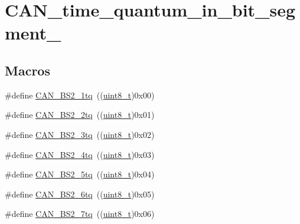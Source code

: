 \hypertarget{group___c_a_n__time__quantum__in__bit__segment__2}{}\section{C\+A\+N\+\_\+time\+\_\+quantum\+\_\+in\+\_\+bit\+\_\+segment\+\_}
\label{group___c_a_n__time__quantum__in__bit__segment__2}
\subsection*{Macros}
\begin{DoxyCompactItemize}
\item 
\#define \hyperlink{group___c_a_n__time__quantum__in__bit__segment__2_gad9af25a3f61df7b09b8d6a5e81d8027e}{C\+A\+N\+\_\+\+B\+S2\+\_\+1tq}~((\hyperlink{_p_e___types_8h_aba7bc1797add20fe3efdf37ced1182c5}{uint8\+\_\+t})0x00)
\item 
\#define \hyperlink{group___c_a_n__time__quantum__in__bit__segment__2_gac43d82f74990620499f1998187ff3602}{C\+A\+N\+\_\+\+B\+S2\+\_\+2tq}~((\hyperlink{_p_e___types_8h_aba7bc1797add20fe3efdf37ced1182c5}{uint8\+\_\+t})0x01)
\item 
\#define \hyperlink{group___c_a_n__time__quantum__in__bit__segment__2_gab3d325ce4a5d0eb1ee8ee50ad4ec7e49}{C\+A\+N\+\_\+\+B\+S2\+\_\+3tq}~((\hyperlink{_p_e___types_8h_aba7bc1797add20fe3efdf37ced1182c5}{uint8\+\_\+t})0x02)
\item 
\#define \hyperlink{group___c_a_n__time__quantum__in__bit__segment__2_gaaff1c1cdd809f185299971c6437f32a0}{C\+A\+N\+\_\+\+B\+S2\+\_\+4tq}~((\hyperlink{_p_e___types_8h_aba7bc1797add20fe3efdf37ced1182c5}{uint8\+\_\+t})0x03)
\item 
\#define \hyperlink{group___c_a_n__time__quantum__in__bit__segment__2_ga89feba32bcc2e909f858d535edaad101}{C\+A\+N\+\_\+\+B\+S2\+\_\+5tq}~((\hyperlink{_p_e___types_8h_aba7bc1797add20fe3efdf37ced1182c5}{uint8\+\_\+t})0x04)
\item 
\#define \hyperlink{group___c_a_n__time__quantum__in__bit__segment__2_ga72c3245b794d3238763d1ec319bf386f}{C\+A\+N\+\_\+\+B\+S2\+\_\+6tq}~((\hyperlink{_p_e___types_8h_aba7bc1797add20fe3efdf37ced1182c5}{uint8\+\_\+t})0x05)
\item 
\#define \hyperlink{group___c_a_n__time__quantum__in__bit__segment__2_ga8005adaef02fb90e400909de08dec031}{C\+A\+N\+\_\+\+B\+S2\+\_\+7tq}~((\hyperlink{_p_e___types_8h_aba7bc1797add20fe3efdf37ced1182c5}{uint8\+\_\+t})0x06)

\end{DoxyCompactItemize}
